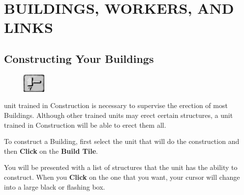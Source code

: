 
\chapter{\textsf{BUILDINGS, WORKERS, AND LINKS}}

\section{\textsf{Constructing Your Buildings}}


\begin{figure}
    \vspace{-20pt}
    \begin{center}
        \includegraphics[width=0.1\textwidth]{Thammer}
    \end{center}
    \vspace{-20pt}
\end{figure}

 unit trained in Construction is necessary to supervise the erection of most Buildings. Although other trained units may erect certain structures, a unit trained in Construction will be able to erect them all.

To construct a Building, first select the unit that will do the construction and then \textbf{Click} on the \textbf{Build Tile}.

You will be presented with a list of structures that the unit has the ability to construct. When you \textbf{Click} on the one that you want, your cursor will change into a large black or flashing box.


